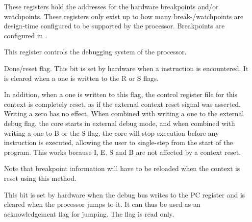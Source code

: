 
These registers hold the addresses for the hardware breakpoints and/or
watchpoints. These registers only exist up to how many break-/watchpoints are
design-time configured to be supported by the processor. Breakpoints are
configured in .

\implementation{}


This register controls the debugging system of the \rvex{} processor.

Done/reset flag. This bit is set by hardware when a  instruction is 
encountered. It is cleared when a one is written to the R or S flags.

In addition, when a one is written to this flag, the control register file for 
this context is completely reset, as if the external context reset signal was 
asserted. Writing a zero has no effect. When combined with writing a one to the 
external debug flag, the core starts in external debug mode, and when combined 
with writing a one to B or the S flag, the core will stop execution before any 
instruction is executed, allowing the user to single-step from the start of the 
program. This works because I, E, S and B are not affected by a context reset.

Note that breakpoint information will have to be reloaded when the context is 
reset using this method.

\implementation{}

This bit is set by hardware when the debug bus writes to the PC register and is 
cleared when the processor jumps to it. It can thus be used as an acknowledgement
flag for jumping. The flag is read only.

